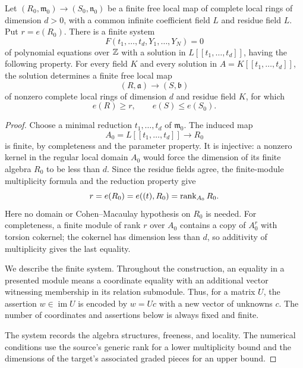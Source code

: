 \begin{lemma}\label{lem:charzero-certificate}
Let $(R_0,\mathfrak m_0)\to(S_0,\mathfrak n_0)$ be a finite free
local map of complete local rings of dimension $d>0$, with a common
infinite coefficient field $L$ and residue field $L$.  Put
$r=e(R_0)$.  There is a finite system
\[
 F(t_1,\ldots,t_d,Y_1,\ldots,Y_N)=0
\]
of polynomial equations over $\mathbb Z$ with a solution in
$L[[t_1,\ldots,t_d]]$, having the following property.  For every field
$K$ and every solution in $A=K[[t_1,\ldots,t_d]]$, the solution
determines a finite free local map
\[
 (R,\mathfrak a)\longrightarrow(S,\mathfrak b)
\]
of nonzero complete local rings of dimension $d$ and residue field
$K$, for which
\[
 e(R)\ge r,\qquad e(S)\le e(S_0).
\]
\end{lemma}

\begin{proof}
Choose a minimal reduction $t_1,\ldots,t_d$ of $\mathfrak m_0$.
The induced map
\[
 A_0=L[[t_1,\ldots,t_d]]\longrightarrow R_0
\]
is finite, by completeness and the parameter property.  It is
injective: a nonzero kernel in the regular local domain $A_0$ would
force the dimension of its finite algebra $R_0$ to be less than $d$.
Since the residue fields agree, the finite-module multiplicity formula
and the reduction property give
\begin{equation}\label{eq:charzero-original-rank}
 r=e(R_0)=e((t),R_0)=\operatorname{rank}_{A_0}R_0.
\end{equation}
Here no domain or Cohen--Macaulay hypothesis on $R_0$ is needed.
For completeness, a finite module of rank $r$ over $A_0$ contains a
copy of $A_0^r$ with torsion cokernel; the cokernel has dimension less
than $d$, so additivity of multiplicity gives the last equality.

We describe the finite system.  Throughout the construction, an
equality in a presented module means a coordinate equality with an
additional vector witnessing membership in its relation submodule.
Thus, for a matrix $U$, the assertion $w\in\operatorname{im}U$ is
encoded by $w=Uc$ with a new vector of unknowns $c$.  The number of
coordinates and assertions below is always fixed and finite.

The system records the algebra structures, freeness, and locality.
The numerical conditions use the source's generic rank for
a lower multiplicity bound and the dimensions of the target's associated
graded pieces for an upper bound.


\end{proof}
